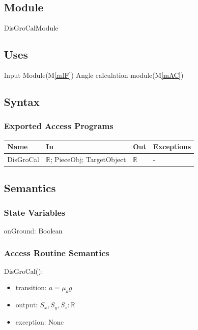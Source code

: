 \documentclass[12pt, titlepage]{article}
\newcommand{\mref}[1]{M\ref{#1}}
\begin{document}
\subsection{Module}

DisGroCalModule

\subsection{Uses}

Input Module(\mref{mIF})
Angle calculation module(\mref{mAC})

\subsection{Syntax}

\subsubsection{Exported Access Programs}

\begin{center}
	\begin{tabular}{p{2cm} p{4cm} p{4cm} p{2cm}}
		\hline
		\textbf{Name} & \textbf{In} & \textbf{Out} & \textbf{Exceptions} \\
		\hline
		DisGroCal & $\mathbb{R}$; PieceObj; TargetObject & $\mathbb{R}$ & - \\
		\hline
	\end{tabular}
\end{center}

\subsection{Semantics}

\subsubsection{State Variables}

onGround: Boolean

\subsubsection{Access Routine Semantics}

\noindent DisGroCal():
\begin{itemize}
	\item transition: $a=\mu_{k}g$ 
	\item output: $S_{x},S_{y},S_{z}: \mathbb{R}$ 
	\item exception: None 
\end{itemize}
\end{document}
